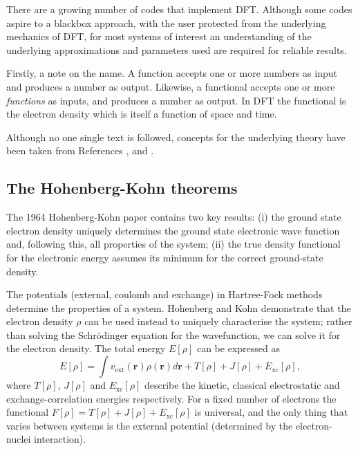 There are a growing number of codes that implement DFT. 
Although some codes aspire to a blackbox approach, with the user protected from the underlying mechanics of DFT, for most systems of interest an understanding of the underlying approximations and parameters used are required for reliable results.


Firstly, a note on the name. A function accepts one or more numbers as input and produces a number as output. Likewise, a functional accepts one or more \textit{functions} as inputs, and produces a number as output. In DFT the functional is the electron density which is itself a function of space and time.



Although no one single text is followed, concepts for the underlying theory have been taken from References \cite{Burke2007}, \cite{Scuseria05} and \cite{Perdew2010}.

\subsection{The Hohenberg-Kohn theorems}

The 1964 Hohenberg-Kohn paper\autocite{Hohenberg1964} contains two key results: (i) the ground state electron density uniquely determines the ground state electronic wave function and, following this, all properties of the system; (ii) the true density functional for the electronic energy assumes its minimum for the correct ground-state density. %

The potentials (external, coulomb and exchange) in Hartree-Fock methods determine the properties of a system. Hohenberg and Kohn demonstrate that the electron density $\rho$ can be used instead to uniquely characterise the system; rather than solving the Schr\"{o}dinger equation for the wavefunction, we can solve it for the electron density. The total energy $E\left[\rho\right]$ can be expressed as
\begin{equation}
 E\left[\rho\right]=\int v_{\textrm{ext}}(\textbf{r})\rho(\textbf{r})d\textbf{r}+T\left[\rho\right]+J\left[\rho\right]+E_{\textrm{xc}}\left[\rho\right],   
\end{equation}
where $T\left[\rho\right]$, $J\left[\rho\right]$ and $E_\textrm{xc}\left[\rho\right]$ describe the kinetic, classical electrostatic and exchange-correlation energies respectively. 
For a fixed number of electrons the functional $F\left[\rho\right]=T\left[\rho\right]+J\left[\rho\right]+E_{\textrm{xc}}\left[\rho\right]$ is universal, and the only thing that varies between systems is the external potential (determined by the electron-nuclei interaction). 

